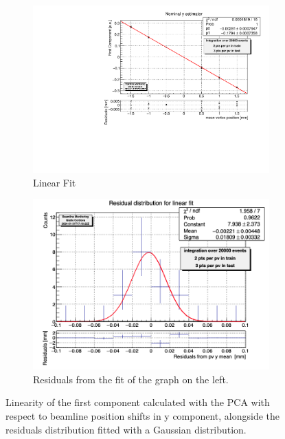 \begin{figure}
    \centering
    \begin{subfigure}{0.48\textwidth}
    \includegraphics[width=\linewidth]{figures/y_fit_MC.pdf}
    \caption{Linear Fit}\label{fig:yfit_MC}
    \end{subfigure}
    \begin{subfigure}{0.48\textwidth}
    \includegraphics[width=\linewidth]{figures/y_res_MC.png}
    \caption{Residuals from the fit of the graph on the left. }\label{fig:yres_MC}
    \end{subfigure}
    \caption{Linearity of the first component calculated with the PCA with respect to beamline position shifts in y component, alongside the residuals distribution fitted with a Gaussian distribution.}
    \label{fig:y_MC}
\end{figure}


